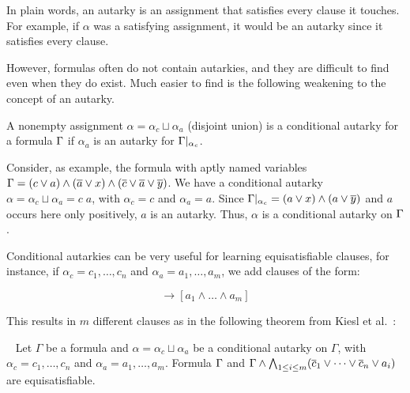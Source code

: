 In plain words, an autarky is an assignment that satisfies every clause it touches. For example, if $\alpha$ was a satisfying assignment, it would be an autarky since it satisfies every clause.

However, formulas often do not contain autarkies, and they are difficult to find even when they do exist. Much easier to find is the following weakening to the concept of an autarky. 

\begin{definition}
    A nonempty assignment $\alpha = \alpha_c \sqcup \alpha_a$ (disjoint union) is a conditional autarky for a formula $\Gamma$ if $\alpha_a$ is an autarky for $\Gamma|_{\alpha_c}$.
\end{definition}

Consider, as example, the formula with aptly named variables $\Gamma = (c \lor a) \land (\overline{a} \lor x) \land (\overline{c} \lor \overline{a} \lor \overline{y})$. We have a conditional autarky $\alpha = \alpha_c \sqcup \alpha_a = c\;a$, with $\alpha_c = c$ and $\alpha_a = a$. Since $\Gamma|_{\alpha_c} = (a \lor x) \land (a \lor \overline{y})$ and $a$ occurs here only positively, $a$ is an autarky. Thus, $\alpha$ is a conditional autarky on $\Gamma$.


Conditional autarkies can be very useful for learning equisatisfiable clauses, for instance, if $\alpha_c = c_1, \dots, c_n$ and $\alpha_a = a_1, \dots, a_m$, we add clauses of the form:

\begin{equation*}
    [c_1 \land \dots \land c_n] \rightarrow [a_1 \land \dots \land a_m]
\end{equation*}

This results in $m$ different clauses as in the following theorem from Kiesl et al.~\cite{conditionalautarkies}:

\begin{theorem}~\label{thm:gbcequisat}
    Let $\Gamma$ be a formula and $\alpha = \alpha_c \sqcup \alpha_a$ be a conditional autarky on $\Gamma$, with $\alpha_c = c_1, \dots, c_n$ and $\alpha_a = a_1, \dots, a_m$. Formula $\Gamma$ and $\Gamma \land \bigwedge_{1 \leq i \leq m} (\overline{c}_1 \lor \dots \lor \overline{c}_n \lor a_i)$ are equisatisfiable.
\end{theorem}


